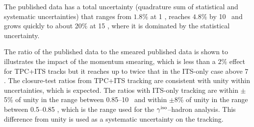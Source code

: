 The published data has a total uncertainty (quadrature sum of statistical and systematic uncertainties) that ranges from $1.8\%$ at 1 \GeVc, reaches $4.8\%$ by 10 \GeVc~and grows quickly to about 20$\%$ at 15 \GeVc, where it is dominated by the statistical uncertainty. 

The ratio of the published data to the smeared published data is shown to illustrates the impact of the momentum smearing, which is less than a $2\%$ effect for TPC+ITS tracks but it reaches up to twice that in the ITS-only case above 7 \GeVc. The closure-test ratios from TPC+ITS tracking are consistent with unity within uncertainties, which is expected. The ratios with ITS-only tracking are within $\pm$5\% of unity in the range between 0.85--10 \GeVc~and within $\pm$8\% of unity in the range between 0.5--0.85 \GeVc, which is the range used for the $\gamma^\mathrm{iso}$--hadron analysis. This difference from unity is used as a systematic uncertainty on the tracking.

